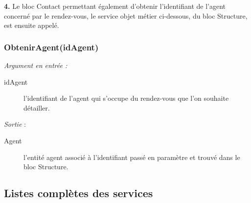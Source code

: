 \begin{shaded}
\textbf{4.} Le bloc Contact permettant également d'obtenir l'identifiant de l'agent concerné par le rendez-vous, le service objet métier ci-dessous, du bloc Structure, est ensuite appelé. 
\end{shaded}


\subsubsection{ObtenirAgent(idAgent)}

\noindent \textit{Argument en entrée :}
\begin{description}
\item[idAgent] l'identifiant de l'agent qui s'occupe du rendez-vous que l'on souhaite détailler. \\
\end{description}

\noindent \textit{Sortie} :
\begin{description}
\item[Agent] l'entité agent associé à l'identifiant passé en paramètre et trouvé dans le bloc Structure. \\
\end{description} 


\restoregeometry
\subsection{Listes complètes des services}

